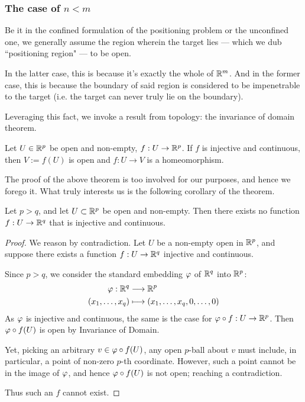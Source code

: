 \subsubsection{The case of $n<m$}
Be it in the confined formulation of the positioning problem or the unconfined one, we generally assume the region wherein the target lies --- which we dub ``positioning region" --- to be open.

In the latter case, this is because it's exactly the whole of $\mathbb R^m$. And in the former case, this is because the boundary of said region is considered to be impenetrable to the target (i.e. the target can never truly lie on the boundary).

Leveraging this fact, we invoke a result from topology: the invariance of domain theorem.

\begin{Theorem}
Let $U\in\mathbb R^p$ be open and non-empty, $f:U\to\mathbb R^p$. If $f$ is injective and continuous, then $V:=f(U)$ is open and $f:U\to V$ is a homeomorphism.
\end{Theorem}

The proof of the above theorem is too involved for our purposes, and hence we forego it. What truly interests us is the following corollary of the theorem.

\begin{Corollary}
    Let $p>q$, and let $U\subset\mathbb R^p$ be open and non-empty. Then there exists no function $f:U\to\mathbb R^q$ that is injective and continuous.
\end{Corollary}

\begin{proof}
We reason by contradiction. Let $U$ be a non-empty open in $\mathbb R^p$, and suppose there exists a function $f:U\to\mathbb R^q$ injective and continuous.

Since $p>q$, we consider the standard embedding $\varphi$ of $\mathbb R^q$ into $\mathbb R^p$:
\begin{align*}
    \varphi: \mathbb R^q &\longrightarrow \mathbb R^p \\
    (x_1, \dots, x_q) &\longmapsto (x_1, \dots, x_q, 0, \dots, 0)
\end{align*}
As $\varphi$ is injective and continuous, the same is the case for $\varphi\circ f: U\to\mathbb R^p$. Then $\varphi\circ f(U)$ is open by Invariance of Domain.

Yet, picking an arbitrary $v\in\varphi\circ f(U)$, any open $p$-ball about $v$ must include, in particular, a point of non-zero $p$-th coordinate. However, such a point cannot be in the image of $\varphi$, and hence $\varphi\circ f(U)$ is not open; reaching a contradiction.

Thus such an $f$ cannot exist.
\end{proof}

